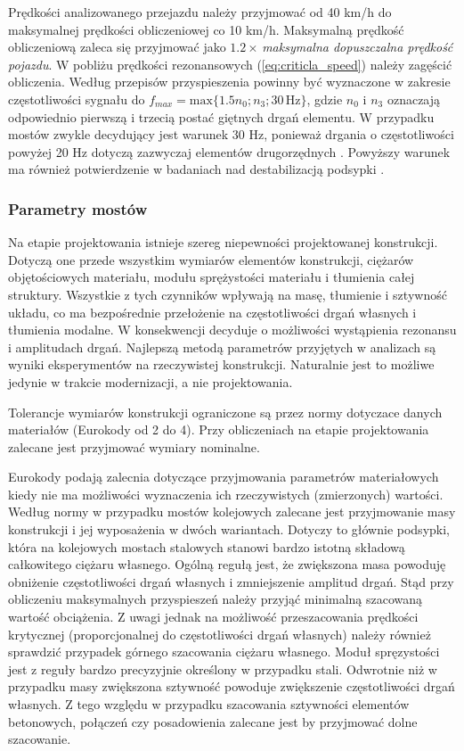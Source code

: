 Prędkości analizowanego przejazdu należy przyjmować od 40 km/h do maksymalnej prędkości obliczeniowej co 10 km/h. Maksymalną prędkość obliczeniową zaleca się przyjmować jako $1.2\times\,$\textit{maksymalna dopuszczalna prędkość pojazdu}. W pobliżu prędkości rezonansowych (\ref{eq:criticla_speed}) należy zagęścić obliczenia. Według przepisów \parencite{PKNj,UnionInternationaleDesCheminsDeFer2009} przyspieszenia powinny być wyznaczone w zakresie częstotliwości sygnału do $f_{max}=\text{max}\{1.5n_0;n_3; 30\,\text{Hz}\}$, gdzie $n_0$ i $n_3$ oznaczają odpowiednio pierwszą i trzecią postać giętnych drgań elementu. W przypadku mostów zwykle decydujący jest warunek 30 Hz, ponieważ drgania o częstotliwości powyżej 20 Hz dotyczą zazwyczaj elementów drugorzędnych \parencite{Oleszek2015b}. Powyższy warunek ma również potwierdzenie w badaniach nad destabilizacją podsypki \parencite{Zacher2008}.

\subsubsection{Parametry mostów}
Na etapie projektowania istnieje szereg niepewności projektowanej konstrukcji. Dotyczą one przede wszystkim wymiarów elementów konstrukcji, ciężarów objętościowych materiału, modułu sprężystości materiału i tłumienia całej struktury. Wszystkie z tych czynników wpływają na masę, tłumienie i sztywność układu, co ma bezpośrednie przełożenie na częstotliwości drgań własnych i tłumienia modalne. W konsekwencji decyduje o możliwości wystąpienia rezonansu i amplitudach drgań. Najlepszą metodą parametrów przyjętych w analizach są wyniki eksperymentów na rzeczywistej konstrukcji. Naturalnie jest to możliwe jedynie w trakcie modernizacji, a nie projektowania. 

Tolerancje wymiarów konstrukcji ograniczone są przez normy dotyczace danych materiałów (Eurokody od 2 do 4). Przy obliczeniach na etapie projektowania zalecane jest przyjmować wymiary nominalne.

Eurokody \cite{PKNg, PKNj} podają zalecnia dotyczące przyjmowania parametrów materiałowych kiedy nie ma możliwości wyznaczenia ich rzeczywistych (zmierzonych) wartości. Według normy \cite{PKNj} w przypadku mostów kolejowych zalecane jest przyjmowanie masy konstrukcji i jej wyposażenia w dwóch wariantach. Dotyczy to głównie podsypki, która na kolejowych mostach stalowych stanowi bardzo istotną składową całkowitego ciężaru własnego. Ogólną regułą jest, że zwiększona masa powoduję obniżenie częstotliwości drgań własnych i zmniejszenie amplitud drgań. Stąd przy obliczeniu maksymalnych przyspieszeń należy przyjąć minimalną szacowaną wartość obciążenia. Z uwagi jednak na możliwość przeszacowania prędkości krytycznej (proporcjonalnej do częstotliwości drgań własnych) należy również sprawdzić przypadek górnego szacowania ciężaru własnego. Moduł spręzystości jest z reguły bardzo precyzyjnie określony w przypadku stali. Odwrotnie niż w przypadku masy zwiększona sztywność powoduje zwiększenie częstotliwości drgań własnych. Z tego względu w przypadku szacowania sztywności elementów betonowych, połączeń czy posadowienia zalecane jest by przyjmować dolne szacowanie.

